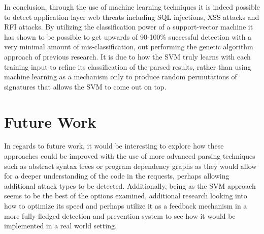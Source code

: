 In conclusion, through the use of machine learning techniques it is indeed possible to detect application layer web threats including SQL injections, XSS attacks and RFI attacks.  By utilizing the classification power of a support-vector machine it has shown to be possible to get upwards of 90-100\% successful detection with a very minimal amount of mis-classification, out performing the genetic algorithm approach of previous research.  It is due to how the SVM truly learns with each training input to refine its classification of the parsed results, rather than using machine learning as a mechanism only to produce random permutations of signatures that allows the SVM to come out on top.

\section{Future Work}

In regards to future work, it would be interesting to explore how these approaches could be improved with the use of more advanced parsing techniques such as abstract syntax trees or program dependency graphs as they would allow for a deeper understanding of the code in the requests, perhaps allowing additional attack types to be detected.  Additionally, being as the SVM approach seems to be the best of the options examined, additional research looking into how to optimize its speed and perhaps utilize it as a feedback mechanism in a more fully-fledged detection and prevention system to see how it would be implemented in a real world setting.
